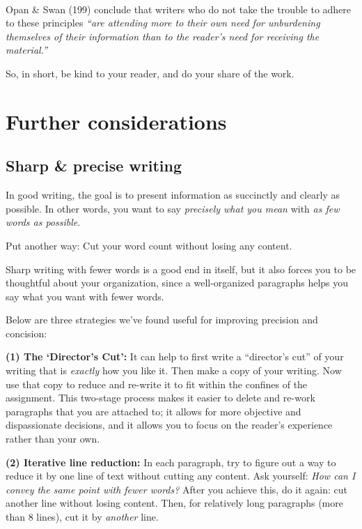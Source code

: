 \documentclass[]{book}
\begin{document}
~

Opan \& Swan (199) conclude that writers who do not take the trouble to adhere to these principles \emph{``are attending more to their own need for unburdening themselves of their information than to the reader's need for receiving the material.''}

So, in short, be kind to your reader, and do your share of the work.

\hypertarget{further-considerations}{%
\section*{Further considerations}\label{further-considerations}}

\hypertarget{sharp-precise-writing}{%
\subsection*{Sharp \& precise writing}\label{sharp-precise-writing}}

In good writing, the goal is to present information as succinctly and clearly as possible. In other words, you want to say \emph{precisely what you mean} with \emph{as few words as possible}.

Put another way: Cut your word count without losing any content.

Sharp writing with fewer words is a good end in itself, but it also forces you to be thoughtful about your organization, since a well-organized paragraphs helps you say what you want with fewer words.

Below are three strategies we've found useful for improving precision and concision:

\textbf{(1) The `Director's Cut':} It can help to first write a ``director's cut'' of your writing that is \emph{exactly} how you like it. Then make a copy of your writing. Now use that copy to reduce and re-write it to fit within the confines of the assignment. This two-stage process makes it easier to delete and re-work paragraphs that you are attached to; it allows for more objective and dispassionate decisions, and it allows you to focus on the reader's experience rather than your own.

\textbf{(2) Iterative line reduction:} In each paragraph, try to figure out a way to reduce it by one line of text without cutting any content. Ask yourself: \emph{How can I convey the same point with fewer words?} After you achieve this, do it again: cut another line without losing content. Then, for relatively long paragraphs (more than 8 lines), cut it by \emph{another} line.
\end{document}
